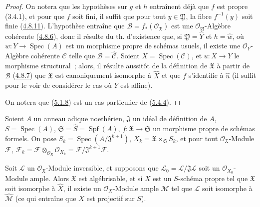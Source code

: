 \begin{proof}
On notera que les hypothèses sur $g$ et $h$ entraînent déjà que $f$ est propre
(3.4.1), et pour que $f$ soit fini, il suffit que pour tout $y\in\mathfrak Y$, la
fibre $f^{-1}(y)$ soit finie (\hyperref[III.4.8.11-fr]{4.8.11}). L'hypothèse
entraîne que $\mathcal B=f_*(\mathcal O_{\mathfrak X})$ est une
$\mathcal O_{\mathfrak Y}$-Algèbre cohérente
(\hyperref[III.4.8.6-fr]{4.8.6}), donc il résulte du th. d'existence que, si
$\mathfrak Y=\widehat Y$ et $h=\widehat w$, où
$w:Y\to\operatorname{Spec}(A)$ est un morphisme propre de schémas usuels, il
existe une $\mathcal O_Y$-Algèbre cohérente $\mathcal C$ telle que
$\mathcal B=\widehat{\mathcal C}$. Soient $X=\operatorname{Spec}(\mathcal C)$, et
$u:X\to Y$ le morphisme structural~; alors, il résulte aussitôt de la définition de
$\mathfrak X$ à partir de $\mathcal B$
(\hyperref[III.4.8.7-fr]{4.8.7}) que $\mathfrak X$ est canoniquement isomorphe à
$\widehat X$ et que $f$ s'identifie à $\widehat u$ (il suffit pour le voir de
considérer le cas où $Y$ est affine).

On notera que (\hyperref[III.5.1.8-fr]{5.1.8}) est un cas particulier de
(\hyperref[III.5.4.4-fr]{5.4.4}).
\end{proof}

\begin{theorem}[5.4.5]
\label{III.5.4.5-fr}
Soient $A$ un anneau adique noethérien, $\mathfrak J$ un idéal de définition de
$A$, $S=\operatorname{Spec}(A)$,
$\mathfrak S=\widehat S=\operatorname{Spf}(A)$,
$f:\mathfrak X\to\mathfrak S$ un morphisme propre de schémas formels. On pose
$S_k=\operatorname{Spec}(A/\mathfrak J^{k+1})$,
$X_k=\mathfrak X\times_{\mathfrak S}S_k$, et pour tout
$\mathcal O_{\mathfrak X}$-Module $\mathcal F$,
$\mathcal F_k=\mathcal F\otimes_{\mathcal O_{\mathfrak X}}\mathcal O_{X_k}
=\mathcal F/\mathfrak J^{k+1}\mathcal F$.


Soit $\mathcal L$ un $\mathcal O_{\mathfrak X}$-Module inversible, et supposons
que $\mathcal L_0=\mathcal L/\mathfrak J\mathcal L$ soit un
$\mathcal O_{X_0}$-Module ample. Alors $\mathfrak X$ est algébrisable, et si
$X$ est un $S$-schéma propre tel que $\mathfrak X$ soit isomorphe à
$\widehat X$, il existe un $\mathcal O_X$-Module ample $\mathcal M$ tel que
$\mathcal L$ soit isomorphe à $\widehat{\mathcal M}$ (ce qui entraîne que
$X$ est projectif sur $S$).
\end{theorem}

